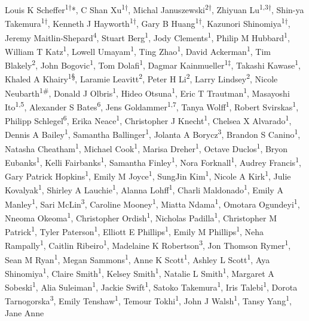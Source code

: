 \documentclass{article}
\begin{document}
\noindent Louis K Scheffer\textsuperscript{1†}*, C Shan Xu\textsuperscript{1†}, Michal Januszewski\textsuperscript{2†}, Zhiyuan Lu\textsuperscript{1,3†}, Shin-ya Takemura\textsuperscript{1†}, Kenneth J Hayworth\textsuperscript{1†}, Gary B Huang\textsuperscript{1†}, Kazunori Shinomiya\textsuperscript{1†}, Jeremy Maitlin-Shepard\textsuperscript{4}, Stuart Berg\textsuperscript{1}, Jody Clements\textsuperscript{1}, Philip M Hubbard\textsuperscript{1}, William T Katz\textsuperscript{1}, Lowell Umayam\textsuperscript{1}, Ting Zhao\textsuperscript{1}, David Ackerman\textsuperscript{1}, Tim Blakely\textsuperscript{2}, John Bogovic\textsuperscript{1}, Tom Dolafi\textsuperscript{1}, Dagmar Kainmueller\textsuperscript{1‡}, Takashi Kawase\textsuperscript{1}, Khaled A Khairy\textsuperscript{1§}, Laramie Leavitt\textsuperscript{2}, Peter H Li\textsuperscript{2}, Larry Lindsey\textsuperscript{2}, Nicole Neubarth\textsuperscript{1\#}, Donald J Olbris\textsuperscript{1}, Hideo Otsuna\textsuperscript{1}, Eric T Trautman\textsuperscript{1}, Masayoshi Ito\textsuperscript{1,5}, Alexander S Bates\textsuperscript{6}, Jens Goldammer\textsuperscript{1,7}, Tanya Wolff\textsuperscript{1}, Robert Svirskas\textsuperscript{1}, Philipp Schlegel\textsuperscript{6}, Erika Neace\textsuperscript{1}, Christopher J Knecht\textsuperscript{1}, Chelsea X Alvarado\textsuperscript{1}, Dennis A Bailey\textsuperscript{1}, Samantha Ballinger\textsuperscript{1}, Jolanta A Borycz\textsuperscript{3}, Brandon S Canino\textsuperscript{1}, Natasha Cheatham\textsuperscript{1}, Michael Cook\textsuperscript{1}, Marisa Dreher\textsuperscript{1}, Octave Duclos\textsuperscript{1}, Bryon Eubanks\textsuperscript{1}, Kelli Fairbanks\textsuperscript{1}, Samantha Finley\textsuperscript{1}, Nora Forknall\textsuperscript{1}, Audrey Francis\textsuperscript{1}, Gary Patrick Hopkins\textsuperscript{1}, Emily M Joyce\textsuperscript{1}, SungJin Kim\textsuperscript{1}, Nicole A Kirk\textsuperscript{1}, Julie Kovalyak\textsuperscript{1}, Shirley A Lauchie\textsuperscript{1}, Alanna Lohff\textsuperscript{1}, Charli Maldonado\textsuperscript{1}, Emily A Manley\textsuperscript{1}, Sari McLin\textsuperscript{3}, Caroline Mooney\textsuperscript{1}, Miatta Ndama\textsuperscript{1}, Omotara Ogundeyi\textsuperscript{1}, Nneoma Okeoma\textsuperscript{1}, Christopher Ordish\textsuperscript{1}, Nicholas Padilla\textsuperscript{1}, Christopher M Patrick\textsuperscript{1}, Tyler Paterson\textsuperscript{1}, Elliott E Phillips\textsuperscript{1}, Emily M Phillips\textsuperscript{1}, Neha Rampally\textsuperscript{1}, Caitlin Ribeiro\textsuperscript{1}, Madelaine K Robertson\textsuperscript{3}, Jon Thomson Rymer\textsuperscript{1}, Sean M Ryan\textsuperscript{1}, Megan Sammons\textsuperscript{1}, Anne K Scott\textsuperscript{1}, Ashley L Scott\textsuperscript{1}, Aya Shinomiya\textsuperscript{1}, Claire Smith\textsuperscript{1}, Kelsey Smith\textsuperscript{1}, Natalie L Smith\textsuperscript{1}, Margaret A Sobeski\textsuperscript{1}, Alia Suleiman\textsuperscript{1}, Jackie Swift\textsuperscript{1}, Satoko Takemura\textsuperscript{1}, Iris Talebi\textsuperscript{1}, Dorota Tarnogorska\textsuperscript{3}, Emily Tenshaw\textsuperscript{1}, Temour Tokhi\textsuperscript{1}, John J Walsh\textsuperscript{1}, Tansy Yang\textsuperscript{1}, Jane Anne 
\end{document}
